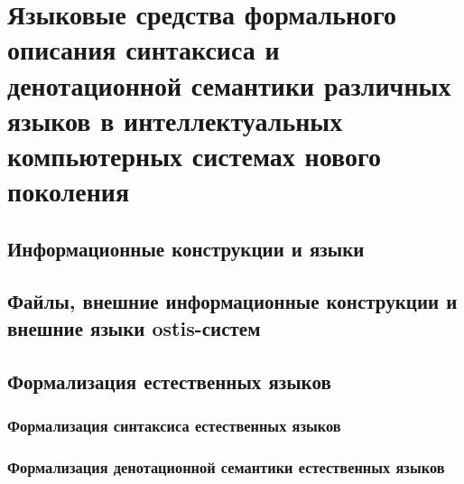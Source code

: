 \chapter{Языковые средства формального описания синтаксиса и денотационной семантики различных языков в интеллектуальных компьютерных системах нового поколения}
\label{chapter_lang}


\section{Информационные конструкции и языки}
\section{Файлы, внешние информационные конструкции и внешние языки ostis-систем}
\section{Формализация естественных языков}
\subsection{Формализация синтаксиса естественных языков}
\subsection{Формализация денотационной семантики естественных языков}

%